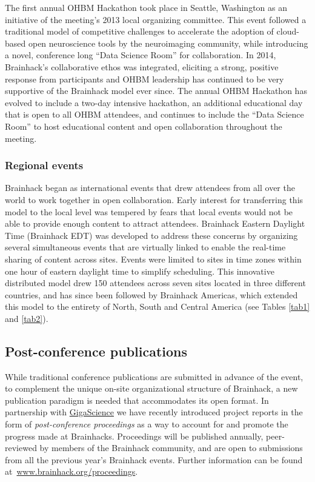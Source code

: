 \documentclass[11pt]{bmc_article_s50}
\begin{document}
The first annual OHBM Hackathon took place in Seattle, Washington as an initiative of the meeting's 2013 local organizing committee. This event followed a traditional model of competitive challenges to accelerate the adoption of cloud-based open neuroscience tools by the neuroimaging community, while introducing a novel, conference long ``Data Science Room'' for collaboration. In 2014, Brainhack's collaborative ethos was integrated, eliciting a strong, positive response from participants and OHBM leadership has continued to be very supportive of the Brainhack model ever since. The annual OHBM Hackathon has evolved to include a two-day intensive hackathon, an additional educational day that is open to all OHBM attendees, and continues to include the ``Data Science Room'' to host educational content and open collaboration throughout the meeting. 

\subsubsection{Regional events}

Brainhack began as international events that drew attendees from all over the world to work together in open collaboration. Early interest for transferring this model to the local level was tempered by fears that local events would not be able to provide enough content to attract attendees. Brainhack Eastern Daylight Time (Brainhack EDT) was developed to address these concerns by organizing several simultaneous events that are virtually linked to enable the real-time sharing of content across sites. Events were limited to sites in time zones within one hour of eastern daylight time to simplify scheduling. This innovative distributed model drew 150 attendees across seven sites located in three different countries, and has since been followed by Brainhack Americas, which extended this model to the entirety of North, South and Central America (see Tables \ref{tab1} and \ref{tab2}).

\subsection{Post-conference publications}

While traditional conference publications are submitted in advance of the event, to complement the unique on-site organizational structure of Brainhack, a new publication paradigm is needed that accommodates its open format. In partnership with \href{http://www.gigasciencejournal.com/}{GigaScience} we have recently introduced project reports in the form of \emph{post-conference proceedings} as a way to account for and promote the progress made at Brainhacks. Proceedings will be published annually, peer-reviewed by members of the Brainhack community, and are open to submissions from all the previous year's Brainhack events. Further information can be found at~\href{http://brainhack.org/proceedings}{www.brainhack.org/proceedings}. 
\end{document}
